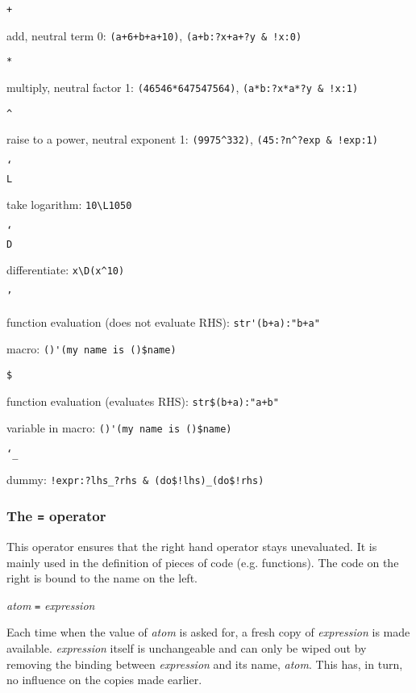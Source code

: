 \documentclass[12pt]{article}
\begin{document}
\begin{description}
\item \texttt{+}

  add, neutral term 0: \verb|(a+6+b+a+10)|,
  \verb|(a+b:?x+a+?y & !x:0)|

\item \texttt{*}

  multiply, neutral factor 1: \verb|(46546*647547564)|,
  \verb|(a*b:?x*a*?y & !x:1)|

\item \texttt{\^}

  raise to a power, neutral exponent 1: \verb|(9975^332)|,
  \verb|(45:?n^?exp & !exp:1)|

\item \texttt{\char`\\ L}

  take logarithm: \verb|10\L1050|

\item \texttt{\char`\\ D}

  differentiate: \verb|x\D(x^10)|

\item \texttt{'}

  function evaluation (does not evaluate RHS): \verb|str'(b+a):"b+a"|

  macro: \verb|()'(my name is ()$name)|

\item \texttt{\$}

  function evaluation (evaluates RHS): \verb|str$(b+a):"a+b"|

  variable in macro: \verb|()'(my name is ()$name)|

\item \texttt{\char`\_}

  dummy: \verb|!expr:?lhs_?rhs & (do$!lhs)_(do$!rhs)|
\end{description}

\subsubsection{The \texttt{=} operator}

This operator ensures that the right hand operator stays
unevaluated. It is mainly used in the definition of pieces of code
(e.g. functions). The code on the right is bound to the name on the
left.

\emph{atom} \verb|=| \emph{expression}

Each time when the value of \emph{atom} is asked for, a fresh copy of
\emph{expression} is made available. \emph{expression} itself is
unchangeable and can only be wiped out by removing the binding between
\emph{expression} and its name, \emph{atom}. This has, in turn, no
influence on the copies made earlier.
\end{document}
